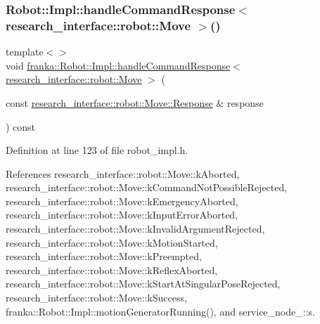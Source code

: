\mbox{\label{namespacefranka_a5a8aedd505670843172f84593054c094}} 
\subsubsection{\texorpdfstring{Robot\+::\+Impl\+::handle\+Command\+Response$<$ research\+\_\+interface\+::robot\+::\+Move $>$()}{Robot::Impl::handleCommandResponse< research\_interface::robot::Move >()}}
{\footnotesize\ttfamily template$<$$>$ \\
void \hyperlink{classfranka_1_1Robot_1_1Impl_ac281e9292f59718758b2c9897b004776}{franka\+::\+Robot\+::\+Impl\+::handle\+Command\+Response}$<$ \hyperlink{structresearch__interface_1_1robot_1_1Move}{research\+\_\+interface\+::robot\+::\+Move} $>$ (\begin{DoxyParamCaption}\item[{const \hyperlink{structresearch__interface_1_1robot_1_1CommandBase_ae8b503e2bc7d72e70b6eb08421e0d853}{research\+\_\+interface\+::robot\+::\+Move\+::\+Response} \&}]{response }\end{DoxyParamCaption}) const\hspace{0.3cm}{\ttfamily [inline]}}



Definition at line 123 of file robot\+\_\+impl.\+h.



References research\+\_\+interface\+::robot\+::\+Move\+::k\+Aborted, research\+\_\+interface\+::robot\+::\+Move\+::k\+Command\+Not\+Possible\+Rejected, research\+\_\+interface\+::robot\+::\+Move\+::k\+Emergency\+Aborted, research\+\_\+interface\+::robot\+::\+Move\+::k\+Input\+Error\+Aborted, research\+\_\+interface\+::robot\+::\+Move\+::k\+Invalid\+Argument\+Rejected, research\+\_\+interface\+::robot\+::\+Move\+::k\+Motion\+Started, research\+\_\+interface\+::robot\+::\+Move\+::k\+Preempted, research\+\_\+interface\+::robot\+::\+Move\+::k\+Reflex\+Aborted, research\+\_\+interface\+::robot\+::\+Move\+::k\+Start\+At\+Singular\+Pose\+Rejected, research\+\_\+interface\+::robot\+::\+Move\+::k\+Success, franka\+::\+Robot\+::\+Impl\+::motion\+Generator\+Running(), and service\+\_\+node\+\_\+::s.


